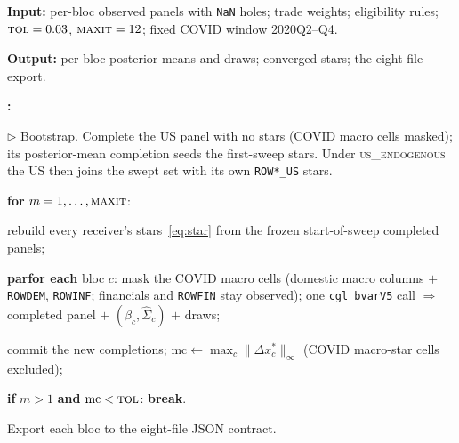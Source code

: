 \documentclass[11pt]{article}
\newcounter{algstep}
\newenvironment{algsteps}
  {\begin{list}{\textbf{\arabic{algstep}:}}{\usecounter{algstep}%
     \setlength{\leftmargin}{2.0em}\setlength{\labelwidth}{1.6em}%
     \setlength{\itemsep}{1.5pt}\setlength{\parsep}{0pt}%
     \setlength{\topsep}{2pt}}}
  {\end{list}}
\newcommand{\algIn}[1]{\noindent\textbf{Input:} #1\par\vspace{1pt}}
\newcommand{\algOut}[1]{\noindent\textbf{Output:} #1\par\vspace{1pt}}
\newcommand{\algInd}{\hspace*{1.4em}}
\newcommand{\algKw}[1]{\textbf{#1}}
\newcommand{\algComment}[1]{{\color{black!55}\(\triangleright\) #1}}
\theoremstyle{plain}
\theoremstyle{remark}
\begin{document}
\begin{algorithm}[!ht]
\caption{GVAR-EM estimation loop
(\texttt{export\_bvar\_gvar24\_loop.m}).}
\label{alg:emgvar}
\algIn{per-bloc observed panels with \texttt{NaN} holes; trade weights;
eligibility rules; $\textsc{tol}=0.03$, $\textsc{maxit}=12$; fixed COVID
window 2020Q2--Q4.}
\algOut{per-bloc posterior means and draws; converged stars; the
eight-file export.}
\begin{algsteps}
\item \algComment{Bootstrap.} Complete the US panel with no stars
  (COVID macro cells masked); its posterior-mean completion seeds the
  first-sweep stars. Under \textsc{us\_endogenous} the US then joins the
  swept set with its own \texttt{ROW*\_US} stars.
\item \algKw{for} $m = 1, \dots, \textsc{maxit}$:
\item \algInd rebuild every receiver's stars~\eqref{eq:star} from the
  frozen start-of-sweep completed panels;
\item \algInd \algKw{parfor each} bloc $c$: mask the COVID macro cells
  (domestic macro columns $+$ \texttt{ROWDEM}, \texttt{ROWINF};
  financials and \texttt{ROWFIN} stay observed); one
  \texttt{cgl\_bvarV5} call $\Rightarrow$ completed panel
  $+$ $(\hat\beta_c, \hat\Sigma_c)$ $+$ draws;
\item \algInd commit the new completions;
  $\mathrm{mc} \gets \max_c\|\Delta x^{*}_c\|_\infty$ (COVID macro-star
  cells excluded);
\item \algInd \algKw{if} $m > 1$ \algKw{and}
  $\mathrm{mc} < \textsc{tol}$: \algKw{break}.
\item Export each bloc to the eight-file JSON contract.
\end{algsteps}
\end{algorithm}
\end{document}

